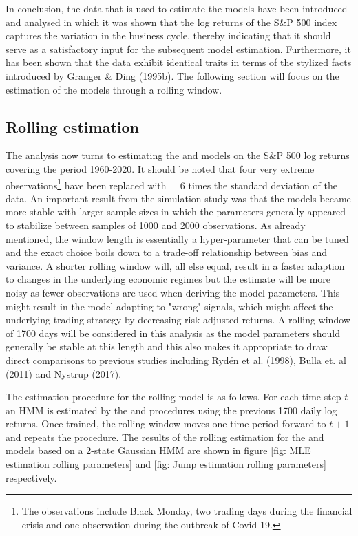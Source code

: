 In conclusion, the data that is used to estimate the models have been introduced and analysed in which it was shown that the log returns of the S\&P 500 index captures the variation in the business cycle, thereby indicating that it should serve as a satisfactory input for the subsequent model estimation. Furthermore, it has been shown that the data exhibit identical traits in terms of the stylized facts introduced by Granger \& Ding (1995b). The following section will focus on the estimation of the models through a rolling window.

\subsection{Rolling estimation}
\label{Sec: rolling estimation}

The analysis now turns to estimating the \mle and \jump models on the S\&P 500 log returns covering the period 1960-2020. It should be noted that four very extreme observations\footnote{The observations include Black Monday, two trading days during the financial crisis and one observation during the outbreak of Covid-19.}
have been replaced with $\pm$ 6 times the standard deviation of the data. An important result from the simulation study was that the models became more stable with larger sample sizes in which the parameters generally appeared to stabilize between samples of 1000 and 2000 observations. As already mentioned, the window length is essentially a hyper-parameter that can be tuned and the exact choice boils down to a trade-off relationship between bias and variance. A shorter rolling window will, all else equal, result in a faster adaption to changes in the underlying economic regimes but the estimate will be more noisy as fewer observations are used when deriving the model parameters. This might result in the model adapting to "wrong" signals, which might affect the underlying trading strategy by decreasing risk-adjusted returns. A rolling window of 1700 days will be considered in this analysis as the model parameters should generally be stable at this length and this also makes it appropriate to draw direct comparisons to previous studies including Rydén et al. (1998), Bulla et. al (2011) and Nystrup (2017).

The estimation procedure for the rolling model is as follows. For each time step $t$ an HMM is estimated by the \mle and \jump procedures using the previous 1700 daily log returns. Once trained, the rolling window moves one time period forward to $t+1$ and repeats the procedure. The results of the rolling estimation for the \mle and \jump models based on a 2-state Gaussian HMM are shown in figure \ref{fig: MLE estimation rolling parameters} and \ref{fig: Jump estimation rolling parameters} respectively.

